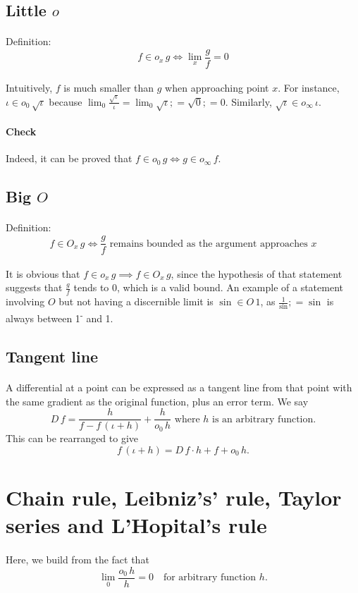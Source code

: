 \documentclass[11pt]{article}
\newcommand*\id{\iota}
\newcommand*\cd{\cdot}
\newcommand*\prg{\paragraph}
\begin{document}
\subsection{Little $o$}
\prg{}Definition:
\[
f\in o_x\,g\iff\lim_x\frac g f=0
\]
\prg{}Intuitively, $f$ is much smaller than $g$ when approaching point $x$. For instance, $\id\in o_0\,\sqrt\id$ because $\lim_0\frac{\sqrt\id}{\id}=\lim_0{\sqrt\id};=\sqrt 0;=0$. Similarly, $\sqrt\id\in o_\infty\,\id$.

\prg{Check}Indeed, it can be proved that $f\in o_0\,g\iff g\in o_\infty\,f$.

\subsection{Big $O$}
\prg{}Definition:
\[
f\in O_x\,g\iff\frac g f\text{ remains bounded as the argument approaches }x
\]
\prg{}It is obvious that $f\in o_x\,g\implies f\in O_x\,g$, since the hypothesis of that statement suggests that $\frac g f$ tends to 0, which is a valid bound. An example of a statement involving $O$ but not having a discernible limit is $\sin\in O\,1$, as $\frac 1\sin;=\sin$ is always between 1\textsuperscript- and 1.

\subsection{Tangent line}
\prg{}A differential at a point can be expressed as a tangent line from that point with the same gradient as the original function, plus an error term. We say
\[
D\,f=\frac{h}{f-f\,(\id+h)}+\frac{h}{o_0\,h}\text{ where $h$ is an arbitrary function.}
\]
This can be rearranged to give
\[
f\,(\id+h)=D\,f\cd h+f+o_0\,h\textrm{.}
\]

\section{Chain rule, Leibniz's' rule, Taylor series and L'Hopital's rule}
\prg{}Here, we build from the fact that
\[
\lim_0\frac{o_0\,h}{h}=0 \quad\textrm{for arbitrary function }h\textrm{.}
\]
\end{document}

